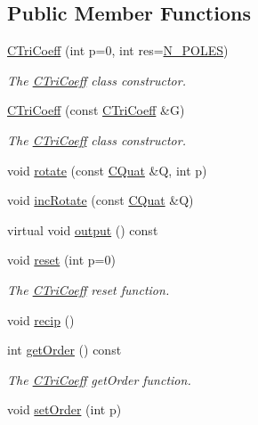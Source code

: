 \subsection*{Public Member Functions}
\begin{DoxyCompactItemize}
\item 
\hyperlink{classCTriCoeff_a00b825a596e5f4dd0184a50c53bd5d3c}{C\-Tri\-Coeff} (int p=0, int res=\hyperlink{mcoeff_8h_ac23f9c13c5d07d9ce386f7a830c35e5a}{N\-\_\-\-P\-O\-L\-E\-S})
\begin{DoxyCompactList}\small\item\em The \hyperlink{classCTriCoeff}{C\-Tri\-Coeff} class constructor. \end{DoxyCompactList}\item 
\hyperlink{classCTriCoeff_ad086149d1a3911a29aeef3dd14ed4042}{C\-Tri\-Coeff} (const \hyperlink{classCTriCoeff}{C\-Tri\-Coeff} \&G)
\begin{DoxyCompactList}\small\item\em The \hyperlink{classCTriCoeff}{C\-Tri\-Coeff} class constructor. \end{DoxyCompactList}\item 
void \hyperlink{classCTriCoeff_aa80c22419286d9fc99daafb90a44d03e}{rotate} (const \hyperlink{classCQuat}{C\-Quat} \&Q, int p)
\item 
void \hyperlink{classCTriCoeff_a2c13fdad1377155cfa7123f8bd04a634}{inc\-Rotate} (const \hyperlink{classCQuat}{C\-Quat} \&Q)
\item 
virtual void \hyperlink{classCTriCoeff_ad4c1064a7de4dd89f81959d842812ee2}{output} () const 
\item 
void \hyperlink{classCTriCoeff_ada2ca53b0a0e3f6b8c9667fd7984e610}{reset} (int p=0)
\begin{DoxyCompactList}\small\item\em The \hyperlink{classCTriCoeff}{C\-Tri\-Coeff} reset function. \end{DoxyCompactList}\item 
void \hyperlink{classCTriCoeff_a0cd79d07cd4eb27e673886611f94f3ab}{recip} ()
\item 
int \hyperlink{classCTriCoeff_a0190ac9feab5bb2cb5e04ea48539b2fe}{get\-Order} () const 
\begin{DoxyCompactList}\small\item\em The \hyperlink{classCTriCoeff}{C\-Tri\-Coeff} get\-Order function. \end{DoxyCompactList}\item 
void \hyperlink{classCTriCoeff_a8df569d14c28af368916f6d6258faa35}{set\-Order} (int p)

\end{DoxyCompactItemize}
